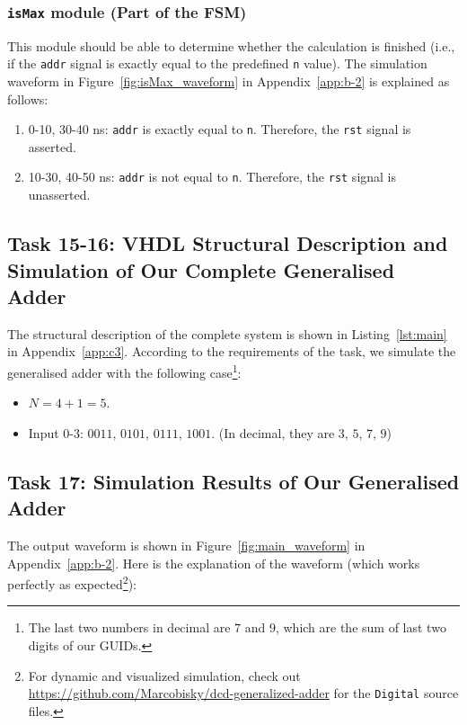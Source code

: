 \documentclass[11pt]{article}
\begin{document}
\subsubsection{\texttt{isMax} module (Part of the FSM)}

This module should be able to determine whether the calculation is finished (i.e., if the \texttt{addr} signal is exactly equal to the predefined \texttt{n} value). The simulation waveform in Figure~\ref{fig:isMax_waveform} in Appendix~\ref{app:b-2} is explained as follows:

\begin{enumerate}
	\item 0-10, 30-40 ns: \texttt{addr} is exactly equal to \texttt{n}. Therefore, the \texttt{rst} signal is asserted.
	\item 10-30, 40-50 ns: \texttt{addr} is not equal to \texttt{n}. Therefore, the \texttt{rst} signal is unasserted.
\end{enumerate}

\subsection{Task 15-16: VHDL Structural Description and Simulation of Our Complete Generalised Adder}
\label{sec:task1516}

The structural description of the complete system is shown in Listing~\ref{lst:main} in Appendix~\ref{app:c3}. According to the requirements of the task, we simulate the generalised adder with the following case\footnote{The last two numbers in decimal are $7$ and $9$, which are the sum of last two digits of our GUIDs.}:

\begin{itemize}
	\item $N=4+1=5$.
	\item Input 0-3: $0011$, $0101$, $0111$, $1001$. (In decimal, they are $3$, $5$, $7$, $9$)
\end{itemize}

\subsection{Task 17: Simulation Results of Our Generalised Adder}
\label{sec:task17}

The output waveform is shown in Figure~\ref{fig:main_waveform} in Appendix~\ref{app:b-2}. Here is the explanation of the waveform (which works perfectly as expected\footnote{For dynamic and visualized simulation, check out \url{https://github.com/Marcobisky/dcd-generalized-adder} for the \texttt{Digital} source files.}):
\end{document}
